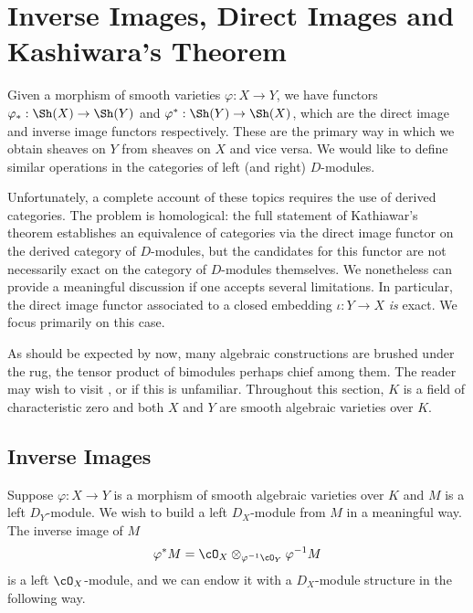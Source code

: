 \section{Inverse Images, Direct Images and Kashiwara's Theorem}
Given a morphism of smooth varieties $\varphi:X\to Y$, we have functors $\varphi_*:\Sh(X)\to \Sh(Y)$ and $\varphi^*:\Sh(Y) \to \Sh(X)$, which are the direct image and inverse image functors respectively. These are the primary way in which we obtain sheaves on $Y$ from sheaves on $X$ and vice versa. We would like to define similar operations in the categories of left (and right) $D$-modules. 

Unfortunately, a complete account of these topics requires the use of derived categories. The problem is homological: the full statement of Kathiawar's theorem establishes an equivalence of categories via the direct image functor on the derived category of $D$-modules, but the candidates for this functor are not necessarily exact on the category of $D$-modules themselves. We nonetheless can provide a meaningful discussion if one accepts several limitations. In particular, the direct image functor associated to a closed embedding $\iota:Y\to X$ \emph{is} exact. We focus primarily on this case.

As should be expected by now, many algebraic constructions are brushed under the rug, the tensor product of bimodules perhaps chief among them. The reader may wish to visit \cite{d-mod-primer}, \cite{d-mod_ps-rt} or \cite{ginzburg_d-mod} if this is unfamiliar. Throughout this section, $K$ is a field of characteristic zero and both $X$ and $Y$ are smooth algebraic varieties over $K$. 

\subsection{Inverse Images}
Suppose $\varphi:X\to Y$ is a morphism of smooth algebraic varieties over $K$ and $M$ is a left $D_Y$-module. We wish to build a left $D_X$-module from $M$ in a meaningful way. The inverse image of $M$
\begin{align*}
	\varphi^*M = \cO_X \otimes_{\varphi^{-1}\cO_Y} \varphi^{-1}M
\end{align*}
is a left $\cO_X$-module, and we can endow it with a $D_X$-module structure in the following way.

